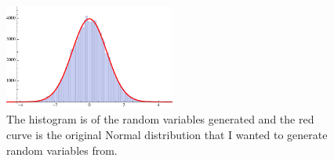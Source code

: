 \documentclass[12pt]{extarticle}
\begin{document}
\begin{figure}
  \centering
  \includegraphics[width=0.5\textwidth]{exmetropolis}
  \caption{The histogram is of the random variables generated and the red curve is the original Normal distribution that I wanted to generate random variables from.}
  \label{fig:exmetropolis}
\end{figure}



\end{document}
